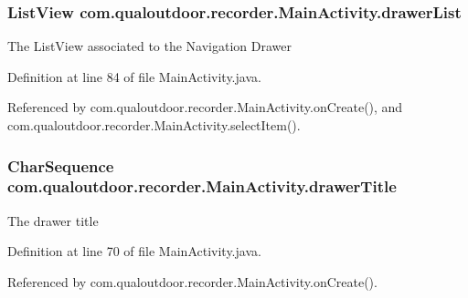 \hypertarget{classcom_1_1qualoutdoor_1_1recorder_1_1MainActivity_ab03934fd9c14fe28a6e5505d41b96cb3}{
\subsubsection[{drawer\-List}]{\setlength{\rightskip}{0pt plus 5cm}List\-View com.\-qualoutdoor.\-recorder.\-Main\-Activity.\-drawer\-List\hspace{0.3cm}{\ttfamily [private]}}}\label{classcom_1_1qualoutdoor_1_1recorder_1_1MainActivity_ab03934fd9c14fe28a6e5505d41b96cb3}
The List\-View associated to the Navigation Drawer 

Definition at line 84 of file Main\-Activity.\-java.



Referenced by com.\-qualoutdoor.\-recorder.\-Main\-Activity.\-on\-Create(), and com.\-qualoutdoor.\-recorder.\-Main\-Activity.\-select\-Item().

\hypertarget{classcom_1_1qualoutdoor_1_1recorder_1_1MainActivity_a6686ec562cfab0110bd52eddc7e33f54}{
\subsubsection[{drawer\-Title}]{\setlength{\rightskip}{0pt plus 5cm}Char\-Sequence com.\-qualoutdoor.\-recorder.\-Main\-Activity.\-drawer\-Title\hspace{0.3cm}{\ttfamily [private]}}}\label{classcom_1_1qualoutdoor_1_1recorder_1_1MainActivity_a6686ec562cfab0110bd52eddc7e33f54}
The drawer title 

Definition at line 70 of file Main\-Activity.\-java.



Referenced by com.\-qualoutdoor.\-recorder.\-Main\-Activity.\-on\-Create().

